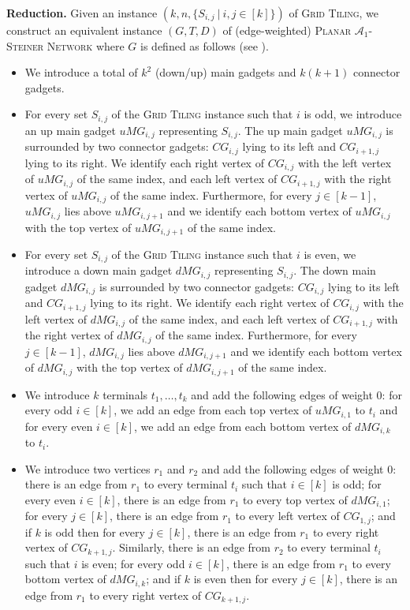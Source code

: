 \documentclass[a4paper,11pt]{article}
\theoremstyle{plain}
\newtheorem{identification rule}{Identification Rule}
\theoremstyle{definition}
\theoremstyle{remark}
\newcommand{\oldC}{\mathcal{A}}
\begin{document}
\noindent
\textbf{Reduction.} Given an instance $(k,n,\{S_{i,j}~|~i,j \in [k]\})$ of \textsc{Grid Tiling}, we construct an equivalent instance $(G,T,D)$ of (edge-weighted) \textsc{Planar $\oldC_1$-Steiner Network} where $G$ is defined as follows (see ). 
\begin{itemize}
\item We introduce a total of $k^2$ (down/up) main gadgets and $k(k+1)$ connector gadgets.
\item For every set $S_{i,j}$ of the \textsc{Grid Tiling} instance such that $i$ is odd, we introduce an up main gadget $uMG_{i,j}$ representing $S_{i,j}$. The up main gadget $uMG_{i,j}$ is surrounded by two connector gadgets: $CG_{i,j}$ lying to its left and $CG_{i+1,j}$ lying to its right. We identify each right vertex of $CG_{i,j}$ with the left vertex of $uMG_{i,j}$ of the same index, and each left vertex of $CG_{i+1,j}$ with the right vertex of $uMG_{i,j}$ of the same index. Furthermore, for every $j \in [k-1]$, $uMG_{i,j}$ lies above $uMG_{i,j+1}$ and we identify each bottom vertex of $uMG_{i,j}$ with the top vertex of $uMG_{i,j+1}$ of the same index.
\item For every set $S_{i,j}$ of the \textsc{Grid Tiling} instance such that $i$ is even, we introduce a down main gadget $dMG_{i,j}$ representing $S_{i,j}$. The down main gadget $dMG_{i,j}$ is surrounded by two connector gadgets: $CG_{i,j}$ lying to its left and $CG_{i+1,j}$ lying to its right. We identify each right vertex of $CG_{i,j}$ with the left vertex of $dMG_{i,j}$ of the same index, and each left vertex of $CG_{i+1,j}$ with the right vertex of $dMG_{i,j}$ of the same index. Furthermore, for every $j \in [k-1]$, $dMG_{i,j}$ lies above $dMG_{i,j+1}$ and we identify each bottom vertex of $dMG_{i,j}$ with the top vertex of $dMG_{i,j+1}$ of the same index.
\item We introduce $k$ terminals $t_1,\ldots,t_k$ and add the following edges of weight 0: for every odd $i \in [k]$, we add an edge from each top vertex of $uMG_{i,1}$ to $t_i$ and for every even $i \in [k]$, we add an edge from each bottom vertex of $dMG_{i,k}$ to $t_i$.
\item We introduce two vertices $r_1$ and $r_2$ and add the following edges of weight 0: there is an edge from $r_1$ to every terminal $t_i$ such that $i \in [k]$ is odd; for every even $i \in [k]$, there is an edge from $r_1$ to every top vertex of $dMG_{i,1}$; for every $j \in [k]$, there is an edge from $r_1$ to every left vertex of $CG_{1,j}$; and if $k$ is odd then for every $j \in [k]$, there is an edge from $r_1$ to every right vertex of $CG_{k+1,j}$. Similarly, there is an edge from $r_2$ to every terminal $t_i$ such that $i$ is even; for every odd $i \in [k]$, there is an edge from $r_1$ to every bottom vertex of $dMG_{i,k}$; and if $k$ is even then for every $j \in [k]$, there is an edge from $r_1$ to every right vertex of $CG_{k+1,j}$.
\end{itemize} 
\end{document}
